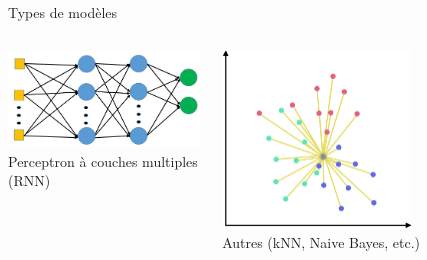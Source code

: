 \documentclass[compress]{beamer}
\begin{document}
\begin{frame}{Types de modèles}
\begin{adjustwidth}{-2.5em}{-2.5em}
\begin{columns}
\begin{column}{0.33\textwidth}
     \includegraphics[width=\textwidth]{resources/MLP}\\
     {\footnotesize Perceptron à couches multiples (RNN)}
   \end{column}
   \begin{column}{0.33\textwidth}
     \centering
     \includegraphics[width=0.65\textwidth]{resources/knn}\\
     {\footnotesize Autres (kNN, Naive Bayes, etc.)}
   \end{column}
  \end{columns}
  \end{adjustwidth}
\end{frame}
\end{document}
